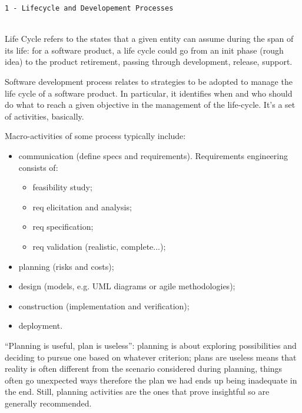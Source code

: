
\begin{center}\texttt{1 - Lifecycle and Developement Processes}\end{center}
\hrulefill \\
Life Cycle refers to the states that a given entity can assume during
the span of its life: for a software product, a life cycle could go from an init phase (rough idea) to the product retirement, passing through development, release, support.

 Software development process relates to strategies to be adopted to
manage the life cycle of a software product. In particular, it identifies
when and who should do what to reach a given objective in the
management of the life-cycle. It's a set of activities, basically.

 Macro-activities of some process typically include:
\begin{itemize}
    \item communication (define specs and requirements). Requirements engineering consists of:
    \begin{itemize}
        \item feasibility study;
        \item req elicitation and analysis;
        \item req specification;
        \item req validation (realistic, complete...);
    \end{itemize}
    \item planning (risks and costs);
    \item design (models, e.g. UML diagrams or agile methodologies);
    \item construction (implementation and verification);
    \item deployment.
\end{itemize}

 ``Planning is useful, plan is useless'': planning is about exploring possibilities and deciding to pursue one based on whatever criterion; plans are useless means that reality is often different from the scenario considered during planning, things often go unexpected ways therefore the plan we had ends up being inadequate in the end. Still, planning activities are the ones that prove insightful so are generally recommended.

